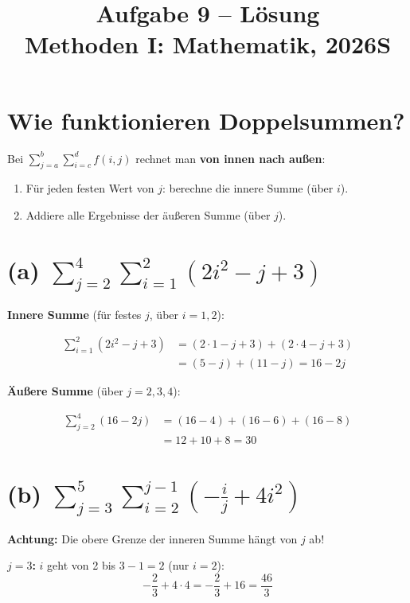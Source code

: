 \documentclass[12pt, a4paper]{article}
\title{\textbf{Aufgabe 9 -- Lösung} \\ Methoden I: Mathematik, 2026S}
\author{}
\date{}
\begin{document}
\maketitle

\section*{Wie funktionieren Doppelsummen?}

Bei $\displaystyle\sum_{j=a}^{b} \sum_{i=c}^{d} f(i,j)$ rechnet man \textbf{von innen nach außen}:

\begin{enumerate}
    \item Für jeden festen Wert von $j$: berechne die innere Summe (über $i$).
    \item Addiere alle Ergebnisse der äußeren Summe (über $j$).
\end{enumerate}

\section*{(a) $\displaystyle\sum_{j=2}^{4} \sum_{i=1}^{2} (2i^2 - j + 3)$}

\textbf{Innere Summe} (für festes $j$, über $i = 1, 2$):

\begin{align*}
    \sum_{i=1}^{2} (2i^2 - j + 3) &= (2 \cdot 1 - j + 3) + (2 \cdot 4 - j + 3) \\
    &= (5 - j) + (11 - j) = 16 - 2j
\end{align*}

\textbf{Äußere Summe} (über $j = 2, 3, 4$):

\begin{align*}
    \sum_{j=2}^{4} (16 - 2j) &= (16 - 4) + (16 - 6) + (16 - 8) \\
    &= 12 + 10 + 8 = \boxed{30}
\end{align*}

\section*{(b) $\displaystyle\sum_{j=3}^{5} \sum_{i=2}^{j-1} \left(-\frac{i}{j} + 4i^2\right)$}

\textbf{Achtung:} Die obere Grenze der inneren Summe hängt von $j$ ab!

\bigskip
\textbf{$j = 3$:} $i$ geht von 2 bis $3 - 1 = 2$ (nur $i = 2$):
\[
    -\frac{2}{3} + 4 \cdot 4 = -\frac{2}{3} + 16 = \frac{46}{3}
\]
\end{document}
